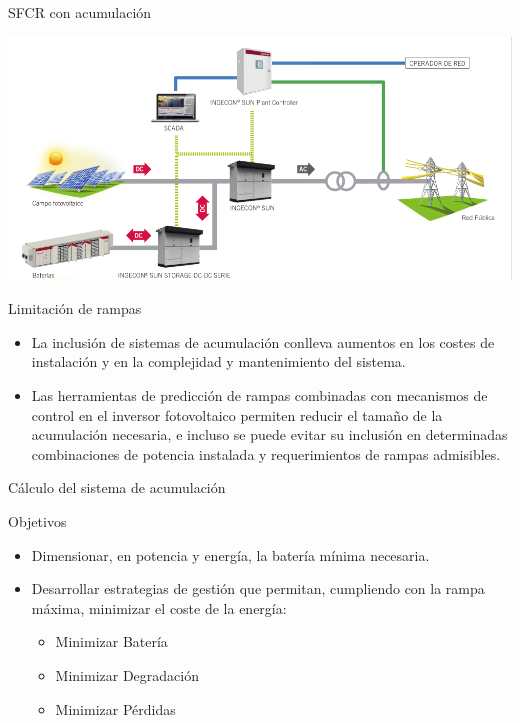 \documentclass[aspectratio=169, usenames,svgnames,dvipsnames]{beamer}
\begin{document}
\begin{frame}[label={sec:org5b11872}]{SFCR con acumulación}
\begin{center}
\includegraphics[width=\textwidth]{../figs/EsquemaSFCRAcumulacion.pdf}
\end{center}
\end{frame}

\begin{frame}[label={sec:orgab7de25}]{Limitación de rampas}
\begin{itemize}
\item La inclusión de sistemas de acumulación conlleva aumentos en los
costes de instalación y en la complejidad y mantenimiento del
sistema.

\item Las herramientas de predicción de rampas combinadas con mecanismos
de control en el inversor fotovoltaico permiten reducir el tamaño de
la acumulación necesaria, e incluso se puede evitar su inclusión en
determinadas combinaciones de potencia instalada y requerimientos de
rampas admisibles.
\end{itemize}
\end{frame}

\begin{frame}[label={sec:org8aa47e2}]{Cálculo del sistema de acumulación}
\begin{block}{Objetivos}
\begin{itemize}
\item Dimensionar, en potencia y energía, la batería mínima necesaria.
\item Desarrollar estrategias de gestión que permitan, cumpliendo con la rampa máxima, minimizar el coste de la energía:
\begin{itemize}
\item Minimizar Batería
\item Minimizar Degradación
\item Minimizar Pérdidas
\end{itemize}
\end{itemize}
\end{block}
\end{frame}
\end{document}

